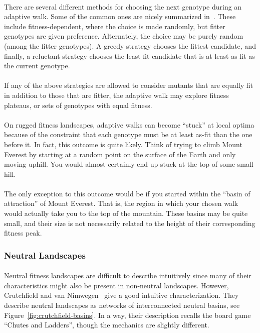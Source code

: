 \documentclass[12pt,letterpaper,titlepage]{article}
\begin{document}
\paragraph{}
There are several different methods for choosing the next genotype during an
adaptive walk. Some of the common ones are nicely summarized
in~\cite{Nowak2015}. These include fitness-dependent, where the choice is made
randomly, but fitter genotypes are given preference. Alternately, the choice
may be purely random (among the fitter genotypes). A greedy strategy chooses
the fittest candidate, and finally, a reluctant strategy chooses the least fit
candidate that is at least as fit as the current genotype.

\paragraph{}
If any of the above strategies are allowed to consider mutants that are equally
fit in addition to those that are fitter, the adaptive walk may explore fitness
plateaus, or sets of genotypes with equal fitness.

\paragraph{}
On rugged fitness landscapes, adaptive walks can become ``stuck'' at local
optima because of the constraint that each genotype must be at least as-fit
than the one before it. In fact, this outcome is quite likely. Think of trying
to climb Mount Everest by starting at a random point on the surface of the
Earth and only moving uphill. You would almost certainly end up stuck at the
top of some small hill.

\paragraph{}
The only exception to this outcome would be if you started within the ``basin
of attraction'' of Mount Everest. That is, the region in which your chosen walk
would actually take you to the top of the mountain. These basins may be quite
small, and their size is not necessarily related to the height of their
corresponding fitness peak.

\subsubsection{Neutral Landscapes}

\paragraph{}
Neutral fitness landscapes are difficult to describe intuitively since many of
their characteristics might also be present in non-neutral landscapes. However,
Crutchfield and van Nimwegen~\cite{Crutchfield1999} give a good intuitive
characterization. They describe neutral landscapes as networks of
interconnected neutral basins, see Figure~\ref{fig:crutchfield-basins}. In a
way, their description recalls the board game ``Chutes and Ladders'', though
the mechanics are slightly different.
\end{document}

